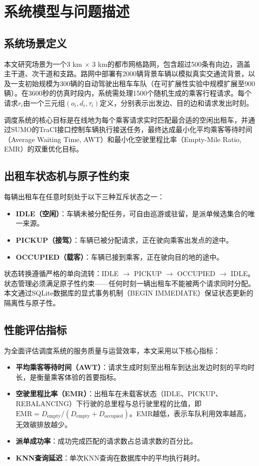 \documentclass[conference]{IEEEtran}
\begin{document}
\section{系统模型与问题描述}

\subsection{系统场景定义}
本文研究场景为一个3 km $\times$ 3 km的都市网格路网，包含超过500条有向边，涵盖主干道、次干道和支路。路网中部署有2000辆背景车辆以模拟真实交通流背景，以及一支初始规模为300辆的自动驾驶出租车车队（在可扩展性实验中规模扩展至900辆）。在3600秒的仿真时段内，系统需处理1500个随机生成的乘客行程请求。每个请求$r_i$由一个三元组$(o_i, d_i, \tau_i)$定义，分别表示出发边、目的边和请求发出时刻。

调度系统的核心目标是在线地为每个乘客请求实时匹配最合适的空闲出租车，并通过SUMO的TraCI接口控制车辆执行接送任务，最终达成最小化平均乘客等待时间（Average Waiting Time, AWT）和最小化空驶里程比率（Empty-Mile Ratio, EMR）的双重优化目标。

\subsection{出租车状态机与原子性约束}
每辆出租车在任意时刻处于以下三种互斥状态之一：
\begin{itemize}
    \item \textbf{IDLE（空闲）}：车辆未被分配任务，可自由巡游或驻留，是派单候选集合的唯一来源。
    \item \textbf{PICKUP（接驾）}：车辆已被分配请求，正在驶向乘客出发点的途中。
    \item \textbf{OCCUPIED（载客）}：车辆已接到乘客，正在驶向目的地的途中。
\end{itemize}
状态转换遵循严格的单向流转：IDLE $\rightarrow$ PICKUP $\rightarrow$ OCCUPIED $\rightarrow$ IDLE。状态管理必须满足原子性约束——任何时刻一辆出租车不能被两个请求同时分配。本文通过SQLite数据库的显式事务机制（BEGIN IMMEDIATE）保证状态更新的隔离性与原子性。

\subsection{性能评估指标}
为全面评估调度系统的服务质量与运营效率，本文采用以下核心指标：
\begin{itemize}
    \item \textbf{平均乘客等待时间（AWT）}：请求生成时刻至出租车到达出发边时刻的平均时长，是衡量乘客体验的首要指标。
    \item \textbf{空驶里程比率（EMR）}：出租车在未载客状态（IDLE、PICKUP、REBALANCING）下行驶的总里程与总行驶里程的比值，即$\text{EMR} = D_{\text{empty}} / (D_{\text{empty}} + D_{\text{occupied}})$。EMR越低，表示车队利用效率越高，无效碳排放越少。
    \item \textbf{派单成功率}：成功完成匹配的请求数占总请求数的百分比。
    \item \textbf{KNN查询延迟}：单次KNN查询在数据库中的平均执行耗时。
\end{itemize}
\end{document}
